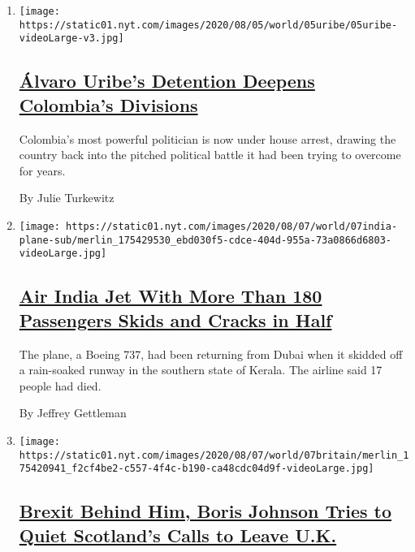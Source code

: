 \begin{enumerate}
\def\labelenumi{\arabic{enumi}.}
\item
  \texttt{[image: https://static01.nyt.com/images/2020/08/05/world/05uribe/05uribe-videoLarge-v3.jpg]}

  \hypertarget{uxe1lvaro-uribes-detention-deepens-colombias-divisions}{%
  \subsection{\texorpdfstring{\href{/2020/08/07/world/americas/uribe-colombia-house-arrest.html}{Álvaro
  Uribe's Detention Deepens Colombia's
  Divisions}}{Álvaro Uribe's Detention Deepens Colombia's Divisions}}\label{uxe1lvaro-uribes-detention-deepens-colombias-divisions}}

  Colombia's most powerful politician is now under house arrest, drawing
  the country back into the pitched political battle it had been trying
  to overcome for years.

  By Julie Turkewitz
\item
  \texttt{[image: https://static01.nyt.com/images/2020/08/07/world/07india-plane-sub/merlin\_175429530\_ebd030f5-cdce-404d-955a-73a0866d6803-videoLarge.jpg]}

  \hypertarget{air-india-jet-with-more-than-180-passengers-skids-and-cracks-in-half}{%
  \subsection{\texorpdfstring{\href{/2020/08/07/world/asia/air-india-plane-crash.html}{Air
  India Jet With More Than 180 Passengers Skids and Cracks in
  Half}}{Air India Jet With More Than 180 Passengers Skids and Cracks in Half}}\label{air-india-jet-with-more-than-180-passengers-skids-and-cracks-in-half}}

  The plane, a Boeing 737, had been returning from Dubai when it skidded
  off a rain-soaked runway in the southern state of Kerala. The airline
  said 17 people had died.

  By Jeffrey Gettleman
\item
  \texttt{[image: https://static01.nyt.com/images/2020/08/07/world/07britain/merlin\_175420941\_f2cf4be2-c557-4f4c-b190-ca48cdc04d9f-videoLarge.jpg]}

  \hypertarget{brexit-behind-him-boris-johnson-tries-to-quiet-scotlands-calls-to-leave-uk}{%
  \subsection{\texorpdfstring{\href{/2020/08/07/world/europe/boris-johnson-scotland-ireland-independence.html}{Brexit
  Behind Him, Boris Johnson Tries to Quiet Scotland's Calls to Leave
  U.K.}}{Brexit Behind Him, Boris Johnson Tries to Quiet Scotland's Calls to Leave U.K.}}\label{brexit-behind-him-boris-johnson-tries-to-quiet-scotlands-calls-to-leave-uk}}


\end{enumerate}
